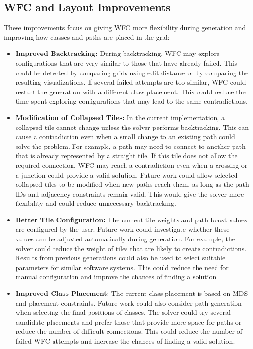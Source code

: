 \documentclass[../main.tex]{subfiles}
\begin{document}
\subsection{WFC and Layout Improvements}

These improvements focus on giving WFC more flexibility during generation and improving how classes and paths are placed in the grid:

\begin{itemize}
    \item \textbf{Improved Backtracking:} During backtracking, WFC may explore configurations that are very similar to those that have already failed. This could be detected by comparing grids using edit distance or by comparing the resulting visualizations. If several failed attempts are too similar, WFC could restart the generation with a different class placement. This could reduce the time spent exploring configurations that may lead to the same contradictions.

    \item \textbf{Modification of Collapsed Tiles:} In the current implementation, a collapsed tile cannot change unless the solver performs backtracking. This can cause a contradiction even when a small change to an existing path could solve the problem. For example, a path may need to connect to another path that is already represented by a straight tile. If this tile does not allow the required connection, WFC may reach a contradiction even when a crossing or a junction could provide a valid solution. Future work could allow selected collapsed tiles to be modified when new paths reach them, as long as the path IDs and adjacency constraints remain valid. This would give the solver more flexibility and could reduce unnecessary backtracking.

    \item \textbf{Better Tile Configuration:} The current tile weights and path boost values are configured by the user. Future work could investigate whether these values can be adjusted automatically during generation. For example, the solver could reduce the weight of tiles that are likely to create contradictions. Results from previous generations could also be used to select suitable parameters for similar software systems. This could reduce the need for manual configuration and improve the chances of finding a solution.

    \item \textbf{Improved Class Placement:} The current class placement is based on MDS and placement constraints. Future work could also consider path generation when selecting the final positions of classes. The solver could try several candidate placements and prefer those that provide more space for paths or reduce the number of difficult connections. This could reduce the number of failed WFC attempts and increase the chances of finding a valid solution.
\end{itemize}
\end{document}
